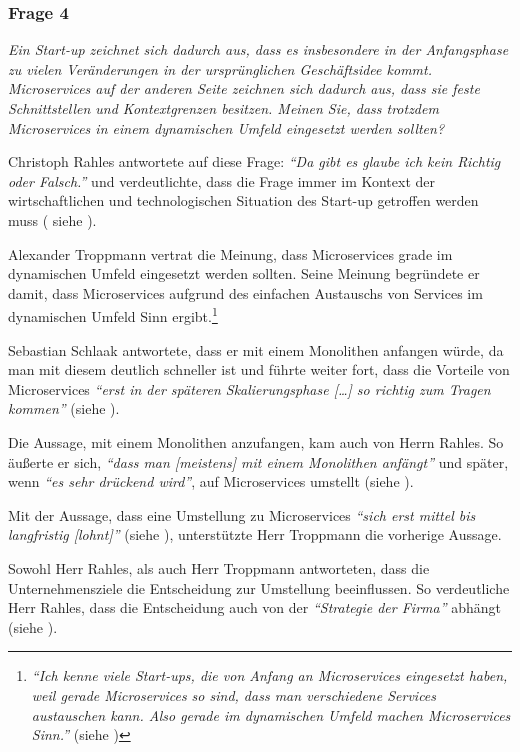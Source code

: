 \subsubsection{Frage 4}
\label{sec:frage4}

\textit{Ein Start-up zeichnet sich dadurch aus, dass es insbesondere in der Anfangsphase zu vielen Veränderungen in der ursprünglichen Geschäftsidee kommt. Microservices auf der anderen Seite zeichnen sich dadurch aus, dass sie feste Schnittstellen und Kontextgrenzen besitzen. Meinen Sie, dass trotzdem Microservices in einem dynamischen Umfeld eingesetzt werden sollten?}

Christoph Rahles antwortete auf diese Frage: \textit{\enquote{Da gibt es glaube ich kein Richtig oder Falsch.}} und verdeutlichte, dass die Frage immer im Kontext der wirtschaftlichen und technologischen Situation des Start-up getroffen werden muss ( siehe ).

Alexander Troppmann vertrat die Meinung, dass Microservices grade im dynamischen Umfeld eingesetzt werden sollten. Seine Meinung begründete er damit, dass Microservices aufgrund des einfachen Austauschs von Services im dynamischen Umfeld Sinn ergibt.\footnote{
\textit{\enquote{Ich kenne viele Start-ups, die von Anfang an Microservices eingesetzt haben, weil gerade Microservices so sind, dass man verschiedene Services austauschen kann. Also gerade im dynamischen Umfeld machen Microservices Sinn.}} (siehe )
}

Sebastian Schlaak antwortete, dass er mit einem Monolithen anfangen würde, da man mit diesem deutlich schneller ist und führte weiter fort, dass die Vorteile von Microservices \textit{\enquote{erst in der späteren Skalierungsphase […] so richtig zum Tragen kommen}} (siehe ).

Die Aussage, mit einem Monolithen anzufangen, kam auch von Herrn Rahles. So äußerte er sich, \textit{\enquote{dass man [meistens] mit einem Monolithen anfängt}} und später, wenn \textit{\enquote{es sehr drückend wird}}, auf Microservices umstellt (siehe ).

Mit der Aussage, dass eine Umstellung zu Microservices \textit{\enquote{sich erst mittel bis langfristig [lohnt]}} (siehe ), unterstützte Herr Troppmann die vorherige Aussage.

Sowohl Herr Rahles, als auch Herr Troppmann antworteten, dass die Unternehmensziele die Entscheidung zur Umstellung beeinflussen. So verdeutliche Herr Rahles, dass die Entscheidung auch von der \textit{\enquote{Strategie der Firma}} abhängt (siehe ).

